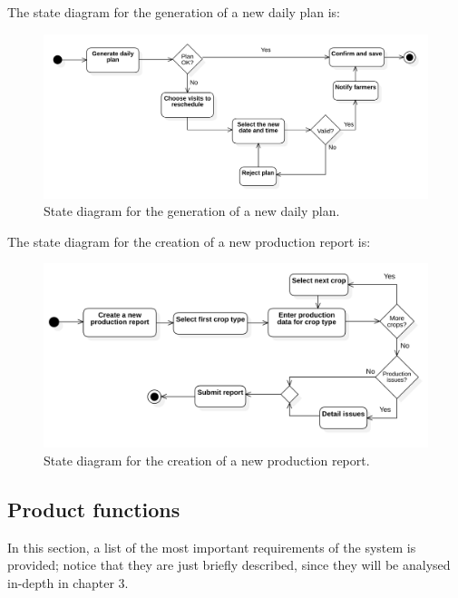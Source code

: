 \documentclass{article}
\begin{document}
The state diagram for the generation of a new daily plan is:
\begin{figure}[H]
    \centering
	\includegraphics[scale=0.35]{state_machine_diagrams/statediagram2.png}
    \caption{State diagram for the generation of a new daily plan.}
\end{figure}
The state diagram for the creation of a new production report is:
\begin{figure}[H]
    \centering
	\includegraphics[scale=0.35]{state_machine_diagrams/statediagram3.png}
    \caption{State diagram for the creation of a new production report.}
\end{figure}
\subsection{Product functions} \label{Product functions}
In this section, a list of the most important requirements of the system is provided; notice 
that they are just briefly described, since they will be analysed in-depth in chapter 3.
\end{document}
